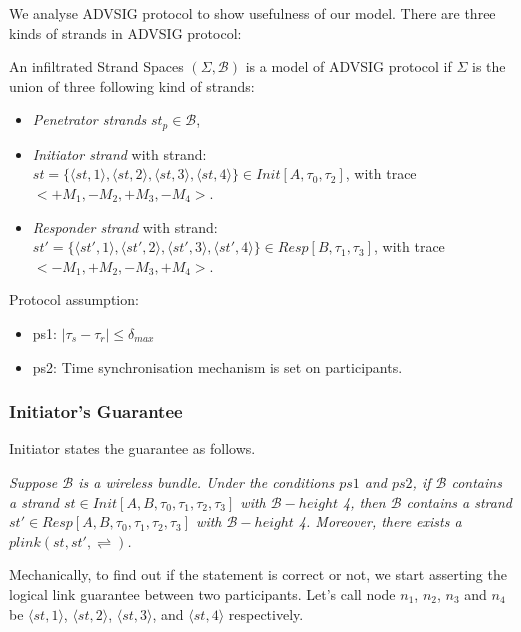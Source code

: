 We analyse ADVSIG protocol to show usefulness of our model. There are three kinds of strands in ADVSIG protocol:

\begin{Definition}
An infiltrated Strand Spaces $(\Sigma,\mathcal{B})$ is a model of ADVSIG protocol if $\Sigma$ is the union of three following kind of strands:
\begin{itemize}
\item \emph{Penetrator strands} $st_p \in \mathcal{B}$,
\item \emph{Initiator strand} with strand: {\footnotesize $st =  \{\langle st, 1 \rangle,\langle st, 2 \rangle,\langle st, 3 \rangle,\langle st, 4 \rangle\} \in Init[A,\tau_0,\tau_2]$}, with trace $<+M_1, -M_2 , +M_3,-M_4>$.
\item \emph{Responder strand} with strand: {\footnotesize $st' = \{\langle st', 1 \rangle,\langle st', 2 \rangle,\langle st', 3 \rangle,\langle st', 4 \rangle\} \in Resp[B,\tau_1,\tau_3]$}, with trace $<-M_1, +M_2 , -M_3,+M_4>$.
\end{itemize}
\end{Definition}

Protocol assumption: 
\begin{itemize}
\item ps1: $|\tau_{s} - \tau_r| \le \delta_{max}$
\item ps2: Time synchronisation mechanism is set on participants.
\end{itemize}

\subsubsection*{Initiator's Guarantee} 

Initiator states the guarantee as follows.

\emph{
Suppose $\mathcal{B}$ is a wireless bundle. Under the conditions $ps1$ and $ps2$, if $\mathcal{B}$ contains a strand $st \in Init[A,B,\tau_0,\tau_1,\tau_2,\tau_3]$ with $\mathcal{B} -height$ 4, then $\mathcal{B}$ contains a strand $st' \in Resp[A,B,\tau_0,\tau_1,\tau_2,\tau_3]$ with $\mathcal{B} -height$ 4. Moreover, there exists a $plink(st,st',\rightleftharpoons)$. 
}

Mechanically, to find out if the statement is correct or not, we start asserting the logical link guarantee between two participants. Let's call node $n_1$,  $n_2$, $n_3$ and $n_4$ be $\langle st,1\rangle$, $\langle st,2\rangle$, $\langle st,3\rangle$, and $\langle st,4\rangle$ respectively. 
 
